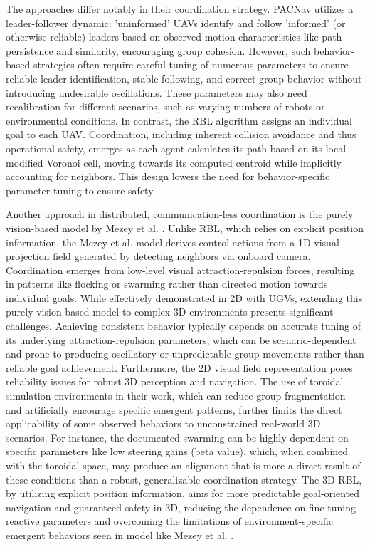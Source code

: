         The approaches differ notably in their coordination strategy. 
        PACNav utilizes a leader-follower dynamic: 'uninformed' \ac{UAV}s identify and follow 'informed' (or otherwise reliable) leaders based on observed motion characteristics like path persistence and similarity, encouraging group cohesion. 
        However, such behavior-based strategies often require careful tuning of numerous parameters to ensure reliable leader identification, stable following, and correct group behavior without introducing undesirable oscillations. 
        These parameters may also need recalibration for different scenarios, such as varying numbers of robots or environmental conditions. 
        In contrast, the \ac{RBL} algorithm assigns an individual goal to each \ac{UAV}. 
        Coordination, including inherent collision avoidance and thus operational safety, emerges as each agent calculates its path based on its local modified Voronoi cell, moving towards its computed centroid while implicitly accounting for neighbors. 
        This design lowers the need for behavior-specific parameter tuning to ensure safety.

        Another approach in distributed, communication-less coordination is the purely vision-based model by Mezey et al. \cite{mezey_pure_vision}. 
        Unlike \ac{RBL}, which relies on explicit position information, the Mezey et al. model derives control actions from a 1D visual projection field generated by detecting neighbors via onboard camera. 
        Coordination emerges from low-level visual attraction-repulsion forces, resulting in patterns like flocking or swarming rather than directed motion towards individual goals. 
        While effectively demonstrated in 2D with \ac{UGV}s, extending this purely vision-based model to complex 3D environments presents significant challenges. 
        Achieving consistent behavior typically depends on accurate tuning of its underlying attraction-repulsion parameters, which can be scenario-dependent and prone to producing oscillatory or unpredictable group movements rather than reliable goal achievement. 
        Furthermore, the 2D visual field representation poses reliability issues for robust 3D perception and navigation. 
        The use of toroidal simulation environments in their work, which can reduce group fragmentation and artificially encourage specific emergent patterns, further limits the direct applicability of some observed behaviors to unconstrained real-world 3D scenarios. 
        For instance, the documented swarming can be highly dependent on specific parameters like low steering gains (beta value), which, when combined with the toroidal space, may produce an alignment that is more a direct result of these conditions than a robust, generalizable coordination strategy. 
        The 3D \ac{RBL}, by utilizing explicit position information, aims for more predictable goal-oriented navigation and guaranteed safety in 3D, reducing the dependence on fine-tuning reactive parameters and overcoming the limitations of environment-specific emergent behaviors seen in model like Mezey et al. \cite{mezey_pure_vision}.

